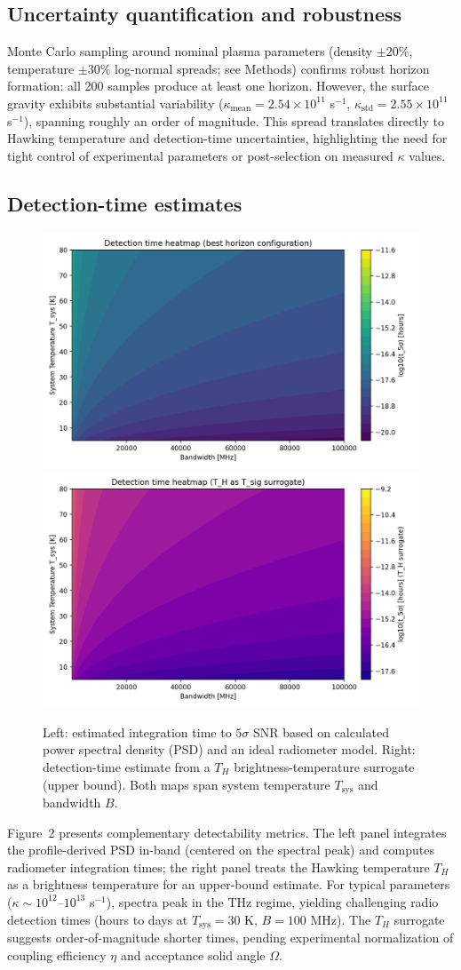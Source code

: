 \documentclass[11pt]{article}
\begin{document}
\subsection{Uncertainty quantification and robustness}
Monte Carlo sampling around nominal plasma parameters (density $\pm$20\%, temperature $\pm$30\% log-normal spreads; see Methods) confirms robust horizon formation: all 200 samples produce at least one horizon. However, the surface gravity exhibits substantial variability ($\kappa_{\text{mean}} = 2.54 \times 10^{11}$ s$^{-1}$, $\kappa_{\text{std}} = 2.55 \times 10^{11}$ s$^{-1}$), spanning roughly an order of magnitude. This spread translates directly to Hawking temperature and detection-time uncertainties, highlighting the need for tight control of experimental parameters or post-selection on measured $\kappa$ values.

\subsection{Detection-time estimates}
\begin{figure}[h]
  \centering
  \includegraphics[width=0.48\linewidth]{figures/horizon_analysis_detection_time.png}\hfill
  \includegraphics[width=0.48\linewidth]{figures/horizon_analysis_detection_time_TH.png}
  \caption{Left: estimated integration time to $5\sigma$ SNR based on calculated power spectral density (PSD) and an ideal radiometer model. Right: detection-time estimate from a $T_H$ brightness-temperature surrogate (upper bound). Both maps span system temperature $T_{\text{sys}}$ and bandwidth $B$.}
\end{figure}

Figure~2 presents complementary detectability metrics. The left panel integrates the profile-derived PSD in-band (centered on the spectral peak) and computes radiometer integration times; the right panel treats the Hawking temperature $T_H$ as a brightness temperature for an upper-bound estimate. For typical parameters ($\kappa \sim 10^{12}$--$10^{13}$ s$^{-1}$), spectra peak in the THz regime, yielding challenging radio detection times (hours to days at $T_{\text{sys}} = 30$ K, $B = 100$ MHz). The $T_H$ surrogate suggests order-of-magnitude shorter times, pending experimental normalization of coupling efficiency $\eta$ and acceptance solid angle $\Omega$.
\end{document}
